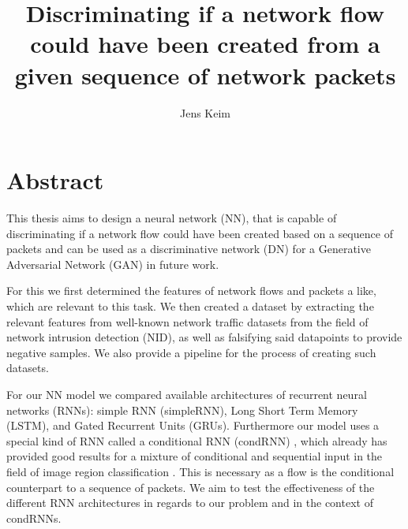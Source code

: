 \documentclass[
	ngerman,
	ruledheaders=section,%
	class=report,%
	thesis={type=bachelor},%
	accentcolor=9c,%
	custommargins=true,%
	marginpar=false,%
	parskip=half-,%
	fontsize=11pt,%
]{tudapub}
\begin{document}

\title{Discriminating if a network flow could have been created from a given sequence of network packets}
\author[J. Keim]{Jens Keim}%


\submissiondate{\today}
\examdate{\today}


\maketitle

\affidavit

\tableofcontents

\chapter{Abstract}
\label{sec:abstract}

This thesis aims to design a neural network (NN), that is capable of discriminating if a network flow could have been created based on a sequence of packets and can be used as a discriminative network (DN) for a Generative Adversarial Network (GAN) in future work.

For this we first determined the features of network flows and packets a like, which are relevant to this task.
We then created a dataset by extracting the relevant features from well-known network traffic datasets from the field of network intrusion detection (NID), as well as falsifying said datapoints to provide negative samples.
We also provide a pipeline for the process of creating such datasets.

For our NN model we compared available architectures of recurrent neural networks (RNNs): simple RNN (simpleRNN), Long Short Term Memory (LSTM), and Gated Recurrent Units (GRUs).
Furthermore our model uses a special kind of RNN called a conditional RNN (condRNN) \cite{remyPhilipperemyCondRnn2020}, which already has provided good results for a mixture of conditional and sequential input in the field of image region classification \cite{karpathyDeepVisualSemanticAlignments2015} \cite{vinyalsShowTellNeural2015}.
This is necessary as a flow is the conditional counterpart to a sequence of packets.
We aim to test the effectiveness of the different RNN architectures in regards to our problem and in the context of condRNNs.
\end{document}
